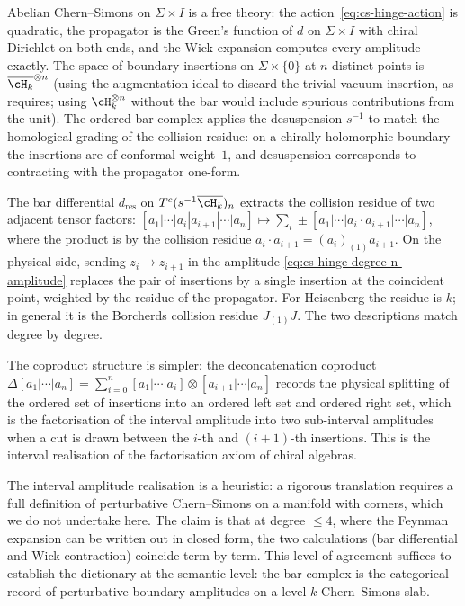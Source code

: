 \begin{remark}[Derivation]
Abelian Chern--Simons on $\Sigma \times I$ is a free theory: the
action~\eqref{eq:cs-hinge-action} is quadratic, the propagator is
the Green's function of $d$ on $\Sigma \times I$ with chiral
Dirichlet on both ends, and the Wick expansion computes every
amplitude exactly. The space of boundary insertions on
$\Sigma \times \{0\}$ at $n$ distinct points is
$\overline{\cH_k}^{\otimes n}$ (using the augmentation ideal to
discard the trivial vacuum insertion, as requires; using
$\cH_k^{\otimes n}$ without the bar would include spurious
contributions from the unit). The ordered bar complex applies
the desuspension $s^{-1}$ to match the homological grading of the
collision residue: on a chirally holomorphic boundary the
insertions are of conformal weight~$1$, and desuspension
corresponds to contracting with the propagator one-form.

The bar differential $d_{\mathrm{res}}$ on
$T^c(s^{-1}\overline{\cH_k})_n$ extracts the collision residue of
two adjacent tensor factors:
$[a_1 | \cdots | a_i | a_{i+1} | \cdots | a_n]
\mapsto \sum_i \pm [a_1 | \cdots | a_i \cdot a_{i+1} |
\cdots | a_n]$, where the product is by the collision residue
$a_i \cdot a_{i+1} = (a_i)_{(1)} a_{i+1}$. On the physical
side, sending $z_i \to z_{i+1}$ in the amplitude
\eqref{eq:cs-hinge-degree-n-amplitude} replaces the pair of
insertions by a single insertion at the coincident point, weighted
by the residue of the propagator. For Heisenberg the
residue is $k$; in general it is the Borcherds collision residue
$J_{(1)} J$. The two descriptions match degree by degree.

The coproduct structure is simpler: the deconcatenation coproduct
$\Delta[a_1 | \cdots | a_n]
= \sum_{i=0}^n [a_1 | \cdots | a_i]
\otimes [a_{i+1} | \cdots | a_n]$ records the physical splitting
of the ordered set of insertions into an ordered left set and
ordered right set, which is the factorisation of the interval
amplitude into two sub-interval amplitudes when a cut is drawn
between the $i$-th and $(i+1)$-th insertions. This is the
interval realisation of the factorisation axiom of chiral
algebras.
\end{remark}

The interval amplitude realisation is a heuristic: a rigorous
translation requires a full definition of perturbative
Chern--Simons on a manifold with corners, which we do not
undertake here. The claim is that at degree $\le 4$, where the
Feynman expansion can be written out in closed form, the two
calculations (bar differential and Wick contraction) coincide
term by term. This level of agreement suffices to establish the
dictionary at the semantic level: the bar complex is the
categorical record of perturbative boundary amplitudes on a
level-$k$ Chern--Simons slab.

